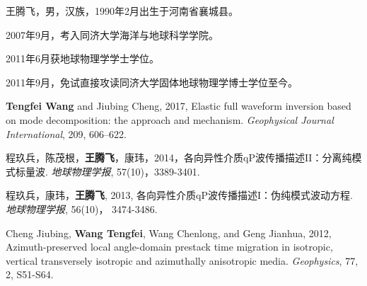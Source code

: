 \begin{resume}


  王腾飞，男，汉族，1990年2月出生于河南省襄城县。

  2007年9月，考入同济大学海洋与地球科学学院。

  2011年6月获地球物理学学士学位。

  2011年9月，免试直接攻读同济大学固体地球物理学博士学位至今。


  \begin{enumerate}[{[}1{]}]
	  \item {\bf{Tengfei Wang}}  and Jiubing Cheng, 2017, Elastic full waveform inversion
		  based on mode decomposition: the approach and mechanism. 
		  \emph{Geophysical Journal International}, 209, 606–622.
	  \item
		  程玖兵，陈茂根，{\bf{王腾飞}}，康玮，2014，各向异性介质qP波传播描述II：分离纯模式标量波. \emph{地球物理学报},
	  57(10)，3389-3401.
  \item  程玖兵，康玮，{\bf{王腾飞}}, 2013,
  各向异性介质qP波传播描述I：伪纯模式波动方程. \emph{地球物理学报},
	  56(10)， 3474-3486.
  \item  Cheng Jiubing, {\bf{Wang Tengfei}}, Wang Chenlong, and Geng Jianhua, 2012, Azimuth-preserved local
	  angle-domain prestack time migration in isotropic, vertical transversely isotropic and
	  azimuthally anisotropic media. \emph{Geophysics}, 77, 2, S51-S64.
  \end{enumerate}


\end{resume}
